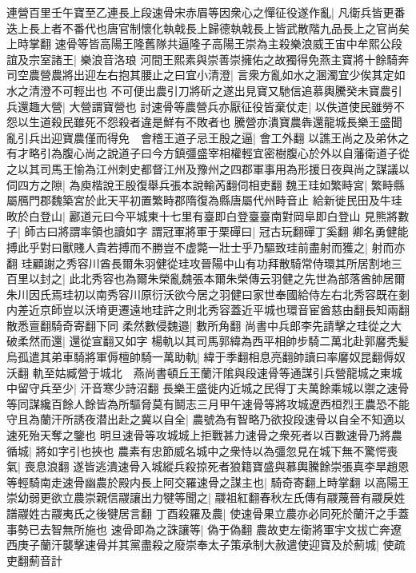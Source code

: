 連營百里壬午寶至乙連長上段速骨宋赤眉等因衆心之憚征役遂作亂|{
	凡衛兵皆更番迭上長上者不番代也唐官制懷化執戟長上歸德執戟長上皆武散階九品長上之官尚矣上時掌翻}
速骨等皆高陽王隆舊隊共逼隆子高陽王崇為主殺樂浪威王宙中牟熙公段誼及宗室諸王|{
	樂浪音洛琅}
河間王熙素與崇善崇擁佑之故獨得免燕主寶將十餘騎奔司空農營農將出迎左右抱其腰止之曰宜小清澄|{
	言衆方亂如水之溷濁宜少俟其定如水之清澄不可輕出也}
不可便出農引刀將斫之遂出見寶又馳信追慕輿騰癸未寶農引兵還趣大營|{
	大營謂寶營也}
討速骨等農營兵亦厭征役皆棄仗走|{
	以佚道使民雖勞不怨以生道殺民雖死不怨殺者違是鮮有不敗者也}
騰營亦潰寶農犇還龍城長樂王盛聞亂引兵出迎寶農僅而得免　會稽王道子忌王殷之逼|{
	會工外翻}
以譙王尚之及弟休之有才略引為腹心尚之說道子曰今方鎮彊盛宰相權輕宜密樹腹心於外以自藩衛道子從之以其司馬王愉為江州刺史都督江州及豫州之四郡軍事用為形援日夜與尚之謀議以伺四方之隙|{
	為庾楷說王殷復舉兵張本說輸芮翻伺相吏翻}
魏王珪如繁畤宮|{
	繁畤縣屬鴈門郡魏築宮於此天平初置繁畤郡隋復為縣唐屬代州畤音止}
給新徙民田及牛珪畋於白登山|{
	酈道元曰今平城東十七里有臺即白登臺臺南對岡阜即白登山}
見熊將數子|{
	師古曰將謂率領也讀如字}
謂冠軍將軍于栗磾曰|{
	冠古玩翻磾丁奚翻}
卿名勇健能搏此乎對曰獸賤人貴若搏而不勝豈不虚斃一壯士乎乃驅致珪前盡射而獲之|{
	射而亦翻}
珪顧謝之秀容川酋長爾朱羽健從珪攻晉陽中山有功拜散騎常侍環其所居割地三百里以封之|{
	此北秀容也為爾朱榮亂魏張本爾朱榮傳云羽健之先世為部落酋帥居爾朱川因氏焉珪初以南秀容川原衍沃欲今居之羽健曰家世奉國給侍左右北秀容既在剗内差近京師豈以沃塉更遷遠地珪許之則北秀容蓋近平城也環音宦酋慈由翻長知兩翻散悉亶翻騎奇寄翻下同}
柔然數侵魏邉|{
	數所角翻}
尚書中兵郎李先請擊之珪從之大破柔然而還|{
	還從宣翻又如字}
楊軌以其司馬郭緯為西平相帥步騎二萬北赴郭黁秃髪烏孤遣其弟車騎將軍傉檀帥騎一萬助軌|{
	緯于季翻相息亮翻帥讀曰率黁奴昆翻傉奴沃翻}
軌至姑臧營于城北　燕尚書頓丘王蘭汗隂與段速骨等通謀引兵營龍城之東城中留守兵至少|{
	汗音寒少詩沼翻}
長樂王盛徙内近城之民得丁夫萬餘乘城以禦之速骨等同謀纔百餘人餘皆為所驅脅莫有鬬志三月甲午速骨等將攻城遼西桓烈王農恐不能守且為蘭汗所誘夜潜出赴之冀以自全|{
	農號為有智略乃欲投段速骨以自全不知適以速死殆天奪之鑒也}
明旦速骨等攻城城上拒戰甚力速骨之衆死者以百數速骨乃將農循城|{
	將如字引也挾也}
農素有忠節威名城中之衆恃以為彊忽見在城下無不驚愕喪氣|{
	喪息浪翻}
遂皆逃潰速骨入城縱兵殺掠死者狼籍寶盛與慕輿騰餘崇張真李旱趙恩等輕騎南走速骨幽農於殿内長上阿交羅速骨之謀主也|{
	騎奇寄翻上時掌翻}
以高陽王崇幼弱更欲立農崇親信鬷讓出力犍等聞之|{
	鬷祖紅翻春秋左氏傳有鬷蔑晉有鬷戾姓譜鬷姓古鬷夷氏之後犍居言翻}
丁酉殺羅及農|{
	使速骨果立農亦必同死於蘭汗之手蓋事勢已去智無所施也}
速骨即為之誅讓等|{
	偽于偽翻}
農故吏左衛將軍宇文拔亡奔遼西庚子蘭汗襲擊速骨并其黨盡殺之廢崇奉太子策承制大赦遣使迎寶及於薊城|{
	使疏吏翻薊音計}

